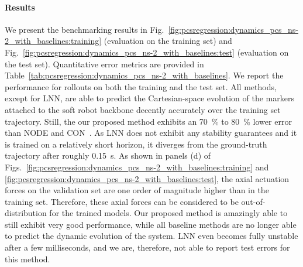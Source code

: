 \paragraph{Results}
We present the benchmarking results in Fig.~\ref{fig:pcsregression:dynamics_pcs_ns-2_with_baselines:training} (evaluation on the training set) and Fig.~\ref{fig:pcsregression:dynamics_pcs_ns-2_with_baselines:test} (evaluation on the test set). Quantitative error metrics are provided in Table~\ref{tab:pcsregression:dynamics_pcs_ns-2_with_baselines}.
We report the performance for rollouts on both the training and the test set.
All methods, except for \gls{LNN}, are able to predict the Cartesian-space evolution of the markers attached to the soft robot backbone decently accurately over the training set trajectory. Still, the our proposed method exhibits an \SI{70}{\percent} to \SI{80}{\percent} lower error than \gls{NODE} and \gls{CON}~\cite{stolzle2024input}. As \gls{LNN} does not exhibit any stability guarantees and it is trained on a relatively short horizon, it diverges from the ground-truth trajectory after roughly \SI{0.15}{s}.
As shown in panels (d) of Figs.~\ref{fig:pcsregression:dynamics_pcs_ns-2_with_baselines:training} and \ref{fig:pcsregression:dynamics_pcs_ns-2_with_baselines:test}, the axial actuation forces on the validation set are one order of magnitude higher than in the training set. Therefore, these axial forces can be considered to be out-of-distribution for the trained models. Our proposed method is amazingly able to still exhibit very good performance, while all baseline methods are no longer able to predict the dynamic evolution of the system. \gls{LNN} even becomes fully unstable after a few milliseconds, and we are, therefore, not able to report test errors for this method.


